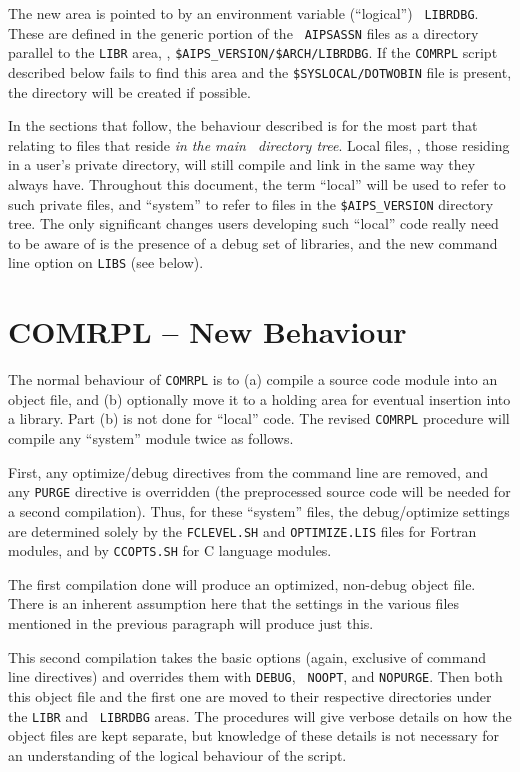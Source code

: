 The new area is pointed to by an environment variable (``logical'') {\tt
LIBRDBG}.  These are defined in the generic portion of the {\tt
AIPSASSN} files as a directory parallel to the {\tt LIBR} area, \ie,
{\tt \$AIPS\_VERSION/\$ARCH/LIBRDBG}.  If the {\tt COMRPL} script
described below fails to find this area and the {\tt \$SYSLOCAL/DOTWOBIN}
file is present, the directory will be created if possible.

In the sections that follow, the behaviour described is for the most
part that relating to files that reside {\it in the main \AIPS\
directory tree\/}.  Local files, \eg, those residing in a user's private
directory, will still compile and link in the same way they always have.
Throughout this document, the term ``local'' will be used to refer to
such private files, and ``system'' to refer to files in the
{\tt\$AIPS\_VERSION} directory tree.  The only significant changes users
developing such ``local'' code really need to be aware of is the
presence of a debug set of libraries, and the new command line option on
{\tt LIBS} (see below).

\section{COMRPL -- New Behaviour}

The normal behaviour of {\tt COMRPL} is to (a) compile a source code
module into an object file, and (b) optionally move it to a holding area
for eventual insertion into a library.  Part (b) is not done for
``local'' code.  The revised {\tt COMRPL} procedure will compile any
``system'' module twice as follows.

First, any optimize/debug directives from the command line are removed,
and any {\tt PURGE} directive is overridden (the preprocessed source
code will be needed for a second compilation).  Thus, for these
``system'' files, the debug/optimize settings are determined solely by
the {\tt FCLEVEL.SH} and {\tt OPTIMIZE.LIS} files for Fortran modules,
and by {\tt CCOPTS.SH} for C language modules.

The first compilation done will produce an optimized, non-debug object
file.  There is an inherent assumption here that the settings in the
various files mentioned in the previous paragraph will produce just
this.

This second compilation takes the basic options (again, exclusive of
command line directives) and overrides them with {\tt DEBUG}, {\tt
NOOPT}, and {\tt NOPURGE}.  Then both this object file and the first one
are moved to their respective directories under the {\tt LIBR} and {\tt
LIBRDBG} areas.  The procedures will give verbose details on how the
object files are kept separate, but knowledge of these details is not
necessary for an understanding of the logical behaviour of the script.

